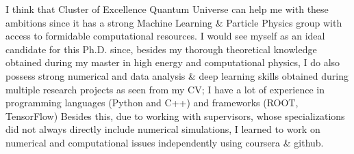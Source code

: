 \documentclass[12pt, a4paper]{awesome-cv}
\begin{document}
\begin{cvletter}
I think that Cluster of Excellence Quantum Universe can help me with these ambitions since it has a strong Machine Learning \& Particle Physics group with access to formidable computational resources.
I would see myself as an ideal candidate for this Ph.D. since, besides my thorough theoretical knowledge obtained during my master in high energy and computational physics, I do also possess strong numerical and data analysis \& deep learning skills obtained during multiple research projects as seen from my CV; I have a lot of experience in programming languages (Python and C++) and frameworks (ROOT, TensorFlow) Besides this, due to working with supervisors, whose specializations did not always directly include numerical simulations, I learned to work on numerical and computational issues independently using coursera \& github.

\end{cvletter}












\makeletterclosing
\end{document}
